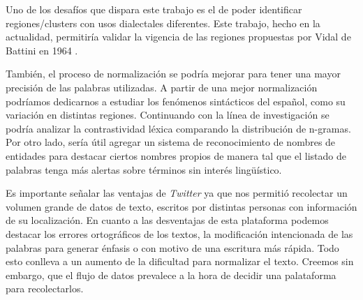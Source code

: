 Uno de los desafíos que dispara este trabajo es el de poder identificar regiones/clusters con usos dialectales diferentes. Este trabajo, hecho en la actualidad, permitiría validar la vigencia de las regiones propuestas por Vidal de Battini en 1964 \cite{vidal1964espanol}. %

También, el proceso de normalización se podría mejorar para tener una mayor precisión de las palabras utilizadas. A partir de una mejor normalización podríamos dedicarnos a estudiar los fenómenos sintácticos del español, como su variación en distintas regiones. Continuando con la línea de investigación se podría analizar la contrastividad léxica comparando la distribución de n-gramas. Por otro lado, sería útil agregar un sistema de reconocimiento de nombres de entidades para destacar ciertos nombres propios de manera tal que el listado de palabras tenga más alertas sobre términos sin interés lingüístico.

Es importante señalar las ventajas de \textit{Twitter} ya que nos permitió recolectar un volumen grande de datos de texto, escritos por distintas personas con información de su localización. En cuanto a las desventajas de esta plataforma podemos destacar los errores ortográficos de los textos, la modificación intencionada de las palabras para generar énfasis o con motivo de una escritura más rápida. Todo esto conlleva a un aumento de la dificultad para normalizar el texto. Creemos sin embargo, que el flujo de datos prevalece a la hora de decidir una palataforma para recolectarlos.

